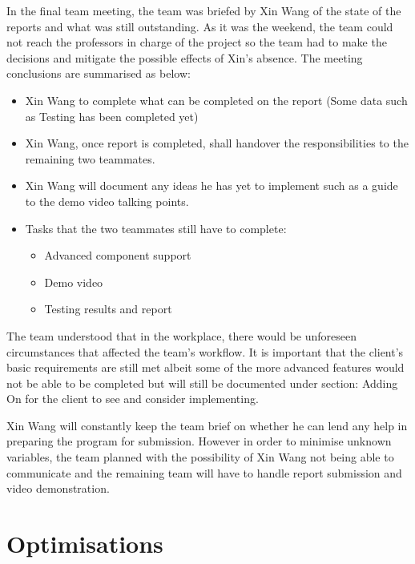 \documentclass[12pt,a4paper]{article}
\begin{document}
In the final team meeting, the team was briefed by Xin Wang of the state of the reports and what was still outstanding. 
As it was the weekend, the team could not reach the professors in charge of the project so the team had to make the 
decisions and mitigate the possible effects of Xin's absence. The meeting conclusions are summarised as below:
\begin{itemize}
	\item Xin Wang to complete what can be completed on the report (Some data such as Testing has been completed yet)
	\item Xin Wang, once report is completed, shall handover the responsibilities to the remaining two teammates.
	\item Xin Wang will document any ideas he has yet to implement such as a guide to the demo video talking points.
	\item Tasks that the two teammates still have to complete:
	\begin{itemize}
		\item Advanced component support
		\item Demo video
		\item Testing results and report  
	\end{itemize}
\end{itemize}
The team understood that in the workplace, there would be unforeseen circumstances that affected the team's workflow.
It is important that the client's basic requirements are still met albeit some of the more advanced features would not be 
able to be completed but will still be documented under section: Adding On for the client to see and consider implementing.
\par 
Xin Wang will constantly keep the team brief on whether he can lend any help in preparing the program for submission. However
in order to minimise unknown variables, the team planned with the possibility of Xin Wang not being able to communicate and the
remaining team will have to handle report submission and video demonstration.
\pagebreak
\section{Optimisations}
\end{document}
